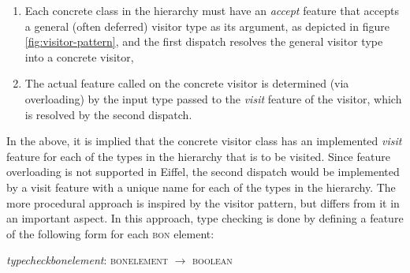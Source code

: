 \begin{enumerate}
\item Each concrete class in the hierarchy must have an \textit{accept} feature that accepts a general (often deferred) visitor type as its argument, as depicted in figure \ref{fig:visitor-pattern}, and the first dispatch resolves the general visitor type into a concrete visitor,
\item The actual feature called on the concrete visitor is determined (via overloading) by the input type passed to the \textit{visit} feature of the visitor, which is resolved by the second dispatch.  
\end{enumerate}
In the above, it is implied that the concrete visitor class has an implemented \textit{visit} feature for each of the types in the hierarchy that is to be visited. Since feature overloading is not supported in Eiffel, the second dispatch would be implemented by a visit feature with a unique name for each of the types in the hierarchy.
The more procedural approach is inspired by the visitor pattern, but differs from it in an important aspect. In this approach, type checking is done by defining a feature of the following form for each \textsc{bon} element:
\begin{center}
\textit{type}\textunderscore\textit{check}\textunderscore\textit{bon}\textunderscore\textit{element}: \textsc{bon}\textunderscore\textsc{element} $\rightarrow$  \textsc{boolean}\\
\end{center}
